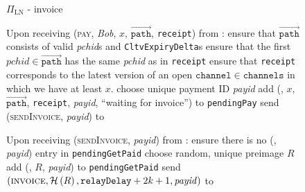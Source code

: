   \begin{figure}[H]
    \begin{protocolbox}{$\Pi_{\mathrm{LN}}$ - invoice}
      \begin{algorithmic}[1]
        \State Upon receiving (\textsc{pay}, \textit{Bob}, $x$,
        $\overrightarrow{\mathtt{path}}$, \texttt{receipt}) from \environment:
        \Indent
          \State ensure that $\overrightarrow{\mathtt{path}}$ consists of valid
          \textit{pchid}s and \texttt{CltvExpiryDelta}s 
          \State ensure that the first $\mathit{pchid} \in
          \overrightarrow{\mathtt{path}}$ has the same \textit{pchid} as in
          \texttt{receipt}
          \State ensure that \texttt{receipt} corresponds to the latest version
          of an open $\mathtt{channel} \in \mathtt{channels}$ in which we have
          at least $x$.
          \State choose unique payment ID \textit{payid} 
          \State add (\bob, $x$, $\overrightarrow{\mathtt{path}}$,
          \texttt{receipt}, \textit{payid}, ``waiting for invoice'') to
          \texttt{pendingPay}
          \State send (\textsc{sendInvoice}, \textit{payid}) to \bob{}
        \EndIndent
        \Statex

        \State Upon receiving (\textsc{sendInvoice}, \textit{payid}) from \bob:
        \Indent
          \State ensure there is no (\bob, \textit{payid}) entry in
          \texttt{pendingGetPaid}
          \State choose random, unique preimage $R$
          \State add (\bob, $R$, \textit{payid}) to \texttt{pendingGetPaid}
          \State send $\left(\textsc{invoice}, \mathcal{H}\left(R\right),
          \mathtt{relayDelay} + 2k + 1, \mathit{payid}\right)$ to \bob{}
        \EndIndent
        \Statex


\end{algorithmic}
\end{protocolbox}
\end{figure}
